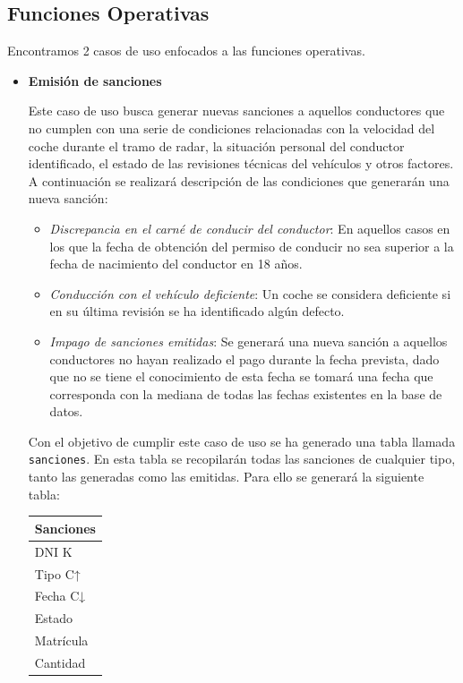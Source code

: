 \documentclass[]{article}
\begin{document}
\subsection{Funciones Operativas}
\label{subsec:funciones_operativas}

Encontramos 2 casos de uso enfocados a las funciones operativas.
\begin{itemize}
    \item \textbf{Emisión de sanciones}
    
    Este caso de uso busca generar nuevas sanciones a aquellos conductores que no cumplen con una serie de condiciones relacionadas con la velocidad del coche durante el tramo de radar, la situación personal del conductor identificado, el estado de las revisiones técnicas del vehículos y otros factores.
    A continuación se realizará descripción de las condiciones que generarán una nueva sanción:
    \begin{itemize}
        \item \textit{Discrepancia en el carné de conducir del conductor}: En aquellos casos en los que la fecha de obtención del permiso de conducir no sea superior a la fecha de nacimiento del conductor en 18 años.
        \item \textit{Conducción con el vehículo deficiente}: Un coche se considera deficiente si en su última revisión se ha identificado algún defecto. 
        \item \textit{Impago de sanciones emitidas}: Se generará una nueva sanción a aquellos conductores no hayan realizado el pago durante la fecha prevista, dado que no se tiene el conocimiento de esta fecha se tomará una fecha que corresponda con la mediana de todas las fechas existentes en la base de datos.
    \end{itemize}

    Con el objetivo de cumplir este caso de uso se ha generado una tabla llamada \texttt{sanciones}. En esta tabla se recopilarán todas las sanciones de cualquier tipo, tanto las generadas como las emitidas. Para ello se generará la siguiente tabla:
\begin{table}[H]
    \centering
    \begin{tabular}{l} 
        \textbf{Sanciones} \\ \hline
        DNI \hspace{0.6cm}K\\
        Tipo \hspace{0.5cm}C↑\\
        Fecha \hspace{0.4cm}C↓\\
        Estado \\
        Matrícula \\
        Cantidad
    \end{tabular}
    \end{table}


\end{itemize}
\end{document}
